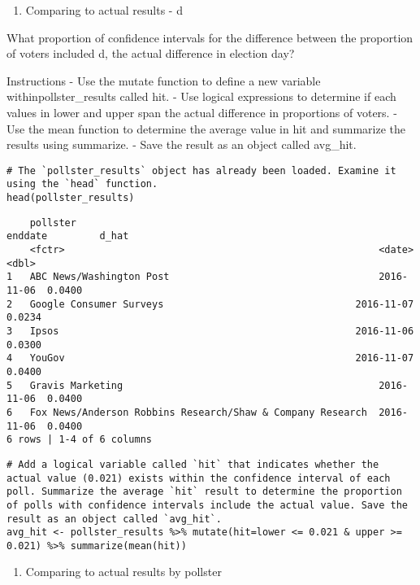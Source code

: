 \documentclass[
]{article}
\providecommand{\tightlist}{%
  \setlength{\itemsep}{0pt}\setlength{\parskip}{0pt}}
\begin{document}
\begin{enumerate}
\def\labelenumi{\arabic{enumi}.}
\setcounter{enumi}{6}
\tightlist
\item
  Comparing to actual results - d
\end{enumerate}

What proportion of confidence intervals for the difference between the
proportion of voters included d, the actual difference in election day?

Instructions - Use the mutate function to define a new variable
withinpollster\_results called hit. - Use logical expressions to
determine if each values in lower and upper span the actual difference
in proportions of voters. - Use the mean function to determine the
average value in hit and summarize the results using summarize. - Save
the result as an object called avg\_hit.

\begin{verbatim}
# The `pollster_results` object has already been loaded. Examine it using the `head` function.
head(pollster_results)
\end{verbatim}

\begin{verbatim}
    pollster                                                    enddate         d_hat
    <fctr>                                                      <date>          <dbl>
1   ABC News/Washington Post                                    2016-11-06  0.0400  
2   Google Consumer Surveys                                 2016-11-07  0.0234  
3   Ipsos                                                   2016-11-06  0.0300  
4   YouGov                                                  2016-11-07  0.0400  
5   Gravis Marketing                                            2016-11-06  0.0400  
6   Fox News/Anderson Robbins Research/Shaw & Company Research  2016-11-06  0.0400  
6 rows | 1-4 of 6 columns
\end{verbatim}

\begin{verbatim}
# Add a logical variable called `hit` that indicates whether the actual value (0.021) exists within the confidence interval of each poll. Summarize the average `hit` result to determine the proportion of polls with confidence intervals include the actual value. Save the result as an object called `avg_hit`.
avg_hit <- pollster_results %>% mutate(hit=lower <= 0.021 & upper >= 0.021) %>% summarize(mean(hit))
\end{verbatim}

\begin{enumerate}
\def\labelenumi{\arabic{enumi}.}
\setcounter{enumi}{7}
\tightlist
\item
  Comparing to actual results by pollster
\end{enumerate}
\end{document}
